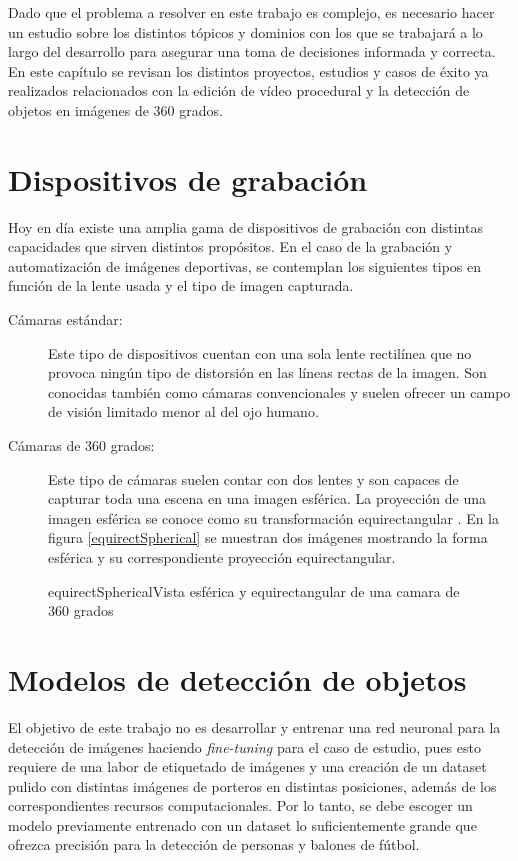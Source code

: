 Dado que el problema a resolver en este trabajo es complejo, es necesario hacer un estudio sobre los distintos tópicos y dominios con los que se trabajará a lo largo del desarrollo para asegurar una toma de decisiones informada y correcta. En este capítulo se revisan los distintos proyectos, estudios y casos de éxito ya realizados relacionados con la edición de vídeo procedural y la detección de objetos en imágenes de 360 grados.

\section[Dispositivos de grabación]{Dispositivos de grabación}
Hoy en día existe una amplia gama de dispositivos de grabación con distintas capacidades que sirven distintos propósitos. En el caso de la grabación y automatización de imágenes deportivas, se contemplan los siguientes tipos en función de la lente usada y el tipo de imagen capturada.
\begin{description}
	\item [Cámaras estándar:] Este tipo de dispositivos cuentan con una sola lente rectilínea que no provoca ningún tipo de distorsión en las líneas rectas de la imagen. Son conocidas también como cámaras convencionales y suelen ofrecer un campo de visión limitado menor al del ojo humano.
	\item [Cámaras de 360 grados:] Este tipo de cámaras suelen contar con dos lentes y son capaces de capturar toda una escena en una imagen esférica. La proyección de una imagen esférica se conoce como su transformación equirectangular \cite{zhang2018omnidirectional}. En la figura \ref{equirectSpherical} se muestran dos imágenes mostrando la forma esférica y su correspondiente proyección equirectangular.
\end{description}


\begin{figure}[Vista esférica y equirectangular]{equirectSpherical}{Vista esférica y equirectangular de una camara de 360 grados\cite{taxonomy_360_videos}}
	\begin{center}
	\end{center}
\end{figure}

\section[Detección de objetos]{Modelos de detección de objetos}
El objetivo de este trabajo no es desarrollar y entrenar una red neuronal para la detección de imágenes haciendo \textit{fine-tuning} para el caso de estudio, pues esto requiere de una labor de etiquetado de imágenes y una creación de un dataset pulido con distintas imágenes de porteros en distintas posiciones, además de los correspondientes recursos computacionales. Por lo tanto, se debe escoger un modelo previamente entrenado con un dataset lo suficientemente grande que ofrezca precisión para la detección de personas y balones de fútbol.

